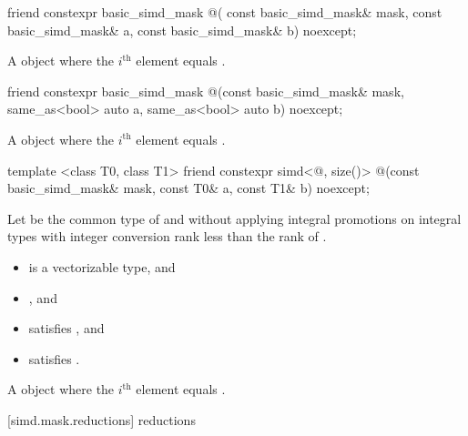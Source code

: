 \begin{itemdecl}
friend constexpr basic_simd_mask @\simdselect@(
  const basic_simd_mask& mask, const basic_simd_mask& a, const basic_simd_mask& b) noexcept;
\end{itemdecl}

\begin{itemdescr}
  \pnum\returns
  A  object where the $i^\text{th}$ element equals  \foralli.
\end{itemdescr}

\begin{itemdecl}
friend constexpr basic_simd_mask
@\simdselect@(const basic_simd_mask& mask, same_as<bool> auto a, same_as<bool> auto b) noexcept;
\end{itemdecl}

\begin{itemdescr}
  \pnum\returns
  A  object where the $i^\text{th}$ element equals  \foralli.
\end{itemdescr}

\begin{itemdecl}
template <class T0, class T1>
  friend constexpr simd<@\seebelow@, size()>
    @\simdselect@(const basic_simd_mask& mask, const T0& a, const T1& b) noexcept;
\end{itemdecl}

\begin{itemdescr}
  \pnum Let  be the common type of  and  without
  applying integral promotions on integral types with integer conversion rank
  less than the rank of .

  \pnum\constraints
  \begin{itemize}
    \item {} is a vectorizable type, and
    \item {}, and
    \item {} satisfies , and
    \item {} satisfies .
  \end{itemize}

  \pnum\returns
  A  object where the $i^\text{th}$ element equals  \foralli.
\end{itemdescr}

[simd.mask.reductions]{ reductions}

